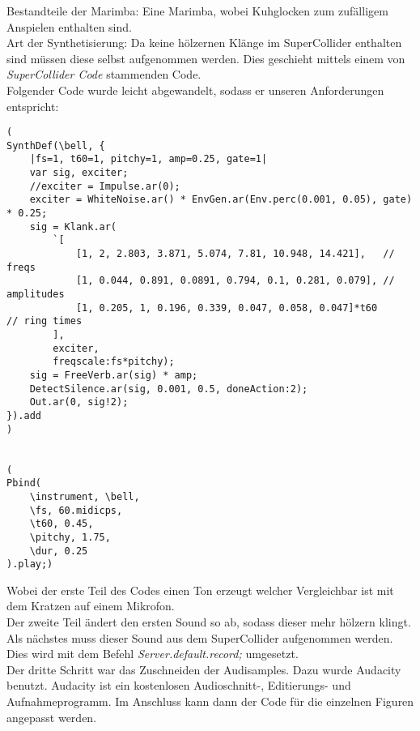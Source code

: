 \documentclass[
10pt, %
a4paper, %
oneside, %
headinclude,footinclude, %
BCOR5mm, %
]{scrartcl}
\begin{document}
\noindent Bestandteile der Marimba: Eine Marimba, wobei Kuhglocken zum zufälligem Anspielen enthalten sind.\\
Art der Synthetisierung: Da keine hölzernen Klänge im SuperCollider enthalten sind müssen diese selbst aufgenommen werden. Dies geschieht mittels 
einem von \textit{SuperCollider Code} stammenden Code.\cite{Marimba}\\
Folgender Code wurde leicht abgewandelt, sodass er unseren Anforderungen entspricht:
\begin{lstlisting}
(
SynthDef(\bell, {
	|fs=1, t60=1, pitchy=1, amp=0.25, gate=1|
	var sig, exciter;
	//exciter = Impulse.ar(0);
	exciter = WhiteNoise.ar() * EnvGen.ar(Env.perc(0.001, 0.05), gate) * 0.25;
	sig = Klank.ar(
		`[
			[1, 2, 2.803, 3.871, 5.074, 7.81, 10.948, 14.421],   // freqs
			[1, 0.044, 0.891, 0.0891, 0.794, 0.1, 0.281, 0.079], // amplitudes
			[1, 0.205, 1, 0.196, 0.339, 0.047, 0.058, 0.047]*t60     // ring times
		],
		exciter,
		freqscale:fs*pitchy);
	sig = FreeVerb.ar(sig) * amp;
	DetectSilence.ar(sig, 0.001, 0.5, doneAction:2);
	Out.ar(0, sig!2);
}).add
)


(
Pbind(
	\instrument, \bell,
	\fs, 60.midicps,
	\t60, 0.45,
	\pitchy, 1.75,
	\dur, 0.25
).play;)
\end{lstlisting}
Wobei der erste Teil des Codes einen Ton erzeugt welcher Vergleichbar ist mit dem Kratzen auf einem Mikrofon.\\
Der zweite Teil ändert den ersten Sound so ab, sodass dieser mehr hölzern klingt.\\
Als nächstes muss dieser Sound aus dem SuperCollider aufgenommen werden. Dies wird mit dem Befehl \textit{Server.default.record;} umgesetzt.\cite{tidcy}\\
Der dritte Schritt war das Zuschneiden der Audisamples. Dazu wurde Audacity benutzt. Audacity ist ein kostenlosen Audioschnitt-, Editierungs- und Aufnahmeprogramm.\cite{Auda} Im Anschluss kann dann der Code für die einzelnen Figuren angepasst werden.\\
		
\end{document}
